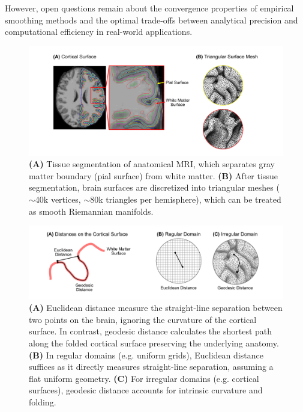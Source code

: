 \documentclass{article}
\begin{document}
However, open questions remain about the convergence properties of empirical smoothing methods and the optimal trade-offs between analytical precision and computational efficiency in real-world applications.

\begin{figure}[H]
    \centering
    \includegraphics[width=0.9\linewidth]{project/figures/fig01.png}
    \caption{
    \textbf{(A)} Tissue segmentation of anatomical MRI, which separates gray matter boundary (pial surface) from white matter. 
    \textbf{(B)} After tissue segmentation, brain surfaces are discretized into triangular meshes ($\sim$40k vertices, $\sim$80k triangles per hemisphere), which can be treated as smooth Riemannian manifolds. 
    }
    \label{fig:surface-data}
\end{figure}

\begin{figure}[H]
    \centering
    \includegraphics[width=0.9\linewidth]{project/figures/fig02.png}
    \caption{
    \textbf{(A)} Euclidean distance measure the straight-line separation between two points on the brain, ignoring the curvature of the cortical surface. In contrast, geodesic distance calculates the shortest path along the folded cortical surface preserving the underlying anatomy.
    \textbf{(B)} In regular domains (e.g. uniform grids), Euclidean distance suffices as it directly measures straight-line separation, assuming a flat uniform geometry. 
    \textbf{(C)} For irregular domains (e.g. cortical surfaces), geodesic distance accounts for intrinsic curvature and folding.
    }
    \label{fig:surface-distances}
\end{figure}
\end{document}
